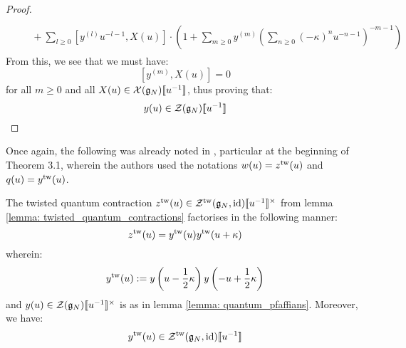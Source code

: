\begin{proof}
$$\begin{aligned}
\begin{aligned}
                                \\
                                & \quad + \sum_{l \geq 0} \left[ y^{(l)} u^{-l - 1}, X(u) \right] \cdot \left( 1 + \sum_{m \geq 0} y^{(m)} \left( \sum_{n \geq 0} (-\kappa)^n u^{-n - 1} \right)^{-m - 1} \right) 
                            \end{aligned}
                        \end{aligned}
                    $$
                From this, we see that we must have:
                    $$[y^{(m)}, X(u)] = 0$$
                for all $m \geq 0$ and all $X(u) \in \mathcal{X}(\mathfrak{g}_N)[\![u^{-1}]\!]$, thus proving that:
                    $$y(u) \in \mathcal{Z}(\mathfrak{g}_N)[\![u^{-1}]\!]$$
            \end{proof}
        Once again, the following was already noted in \cite{guay_regelskis_twisted_yangians_for_symmetric_pairs_of_types_BCD}, particular at the beginning of Theorem 3.1, wherein the authors used the notations $w(u) = z^{\mathrm{tw}}(u)$ and $q(u) = y^{\mathrm{tw}}(u)$.
        \begin{lemma} \label{lemma: twisted_quantum_pfaffians}
            The twisted quantum contraction $z^{\tw}(u) \in \calZ^{\tw}(\g_N, \id)[\![u^{-1}]\!]^{\x}$ from lemma \ref{lemma: twisted_quantum_contractions} factorises in the following manner:
                \begin{equation} \label{equation: twisted_quantum_pfaffians}
                    z^{\mathrm{tw}}(u) = y^{\mathrm{tw}}(u) y^{\mathrm{tw}}(u + \kappa)
                \end{equation}
            wherein:
                $$y^{\mathrm{tw}}(u) := y\left( u - \frac12 \kappa \right) y\left( -u + \frac12 \kappa \right)$$
            and $y(u) \in \calZ(\g_N)[\![u^{-1}]\!]^{\x}$ is as in lemma \ref{lemma: quantum_pfaffians}. Moreover, we have:
                $$y^{\mathrm{tw}}(u) \in \mathcal{Z}^{\mathrm{tw}}(\mathfrak{g}_N, \mathrm{id})[\![u^{-1}]\!]$$
        \end{lemma}
